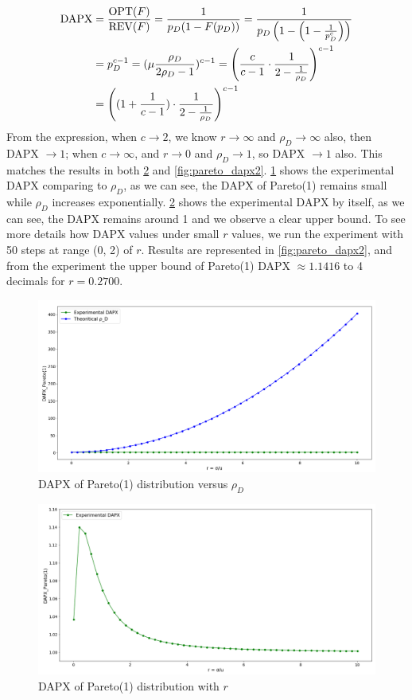 \begin{equation}\notag
\begin{split}
	\text{DAPX} &= \frac{\text{OPT}(F)}{\text{REV}(F)} =\frac{1}{p_D(1-F(p_D))} =\frac{1}{p_D\left(1-\left(1-\frac{1}{p_D^c}\right)\right)}\\& = p_D^{c-1}	 = (\mu \frac{\rho_{D}}{2\rho_{D}  -1})^{c-1} = \left(\frac{c}{c-1} \cdot \frac{1}{2 - \frac{1}{\rho_{D}}}\right)^{c-1}\\& = \left( (1 + \frac{1}{c-1}) \cdot\frac{1}{2 - \frac{1}{\rho_{D}}}\right)^{c-1}
\end{split}
\end{equation} 
From the expression, when $c \to 2$, we know $r \to \infty$ and $\rho_D  \to \infty$ also, then DAPX $\to 1$; when $c \to \infty$, and $r \to 0$ and $\rho_D  \to 1$, so DAPX $\to 1$ also. This matches the results in both \cref{fig:pareto_dapx1} and \cref{fig:pareto_dapx2}. \cref{fig:pareto_dapx3} shows the experimental DAPX comparing to $\rho_D$, as we can see, the DAPX of Pareto(1) remains small while $\rho_D$ increases exponentially. \cref{fig:pareto_dapx1} shows the experimental DAPX by itself, as we can see, the DAPX remains around 1 and we observe a clear upper bound. To see more details how DAPX values under small $r$ values, we run the experiment with 50 steps at range (0, 2) of $r$. Results are represented in \cref{fig:pareto_dapx2}, and from the experiment the upper bound of Pareto(1) DAPX $\approx 1.1416$ to 4 decimals for $r = 0.2700$.     
\begin{figure}[H]
	\centering
	\includegraphics[width=1\textwidth]{pareto_dapx3}
	\caption{DAPX of Pareto(1) distribution versus $\rho_D$}
	\label{fig:pareto_dapx3}
\end{figure}
\begin{figure}[H]
	\centering
	\includegraphics[width=1\textwidth]{pareto_dapx1}
	\caption{DAPX of Pareto(1) distribution with $r$}
	\label{fig:pareto_dapx1}
\end{figure}
